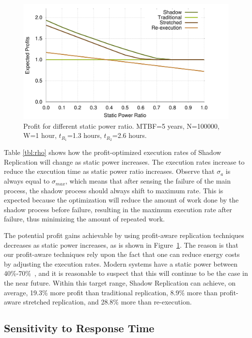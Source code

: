 \begin{figure}[!h]	
	\begin{center}
		\includegraphics[width=\columnwidth]{Figures/rho_profit}
	\end{center}
	\caption{Profit for different static power ratio. MTBF=5 years, N=100000, W=1 hour, $t_{R_1}$=1.3 hours, $t_{R_2}$=2.6 hours.}
	\label{fig:rho}
\end{figure}

Table \ref{tbl:rho} shows how the profit-optimized execution rates
of Shadow Replication will change as static power increases. The execution rates increase to reduce the execution time as static power ratio increases. Observe
that $\sigma_a$ is always equal to $\sigma_{max}$, which means that after
sensing the failure of the main process, the shadow process should always
shift to maximum rate. This is expected because the optimization will
reduce the amount of work done by the shadow process before failure,
resulting in the maximum execution rate after failure, thus
minimizing the amount of repeated work. 

The potential profit gains achievable by using profit-aware
replication techniques decreases as static power increases, as is shown
in Figure~\ref{fig:rho}. The reason is that our profit-aware
techniques rely upon the fact that one can reduce energy costs by
adjusting the execution rates. Modern systems have a static power between 40\%-70\%~\cite{butts2000static}, and
it is reasonable to suspect that this will continue to be the case in the near future. Within
this target range, Shadow Replication can achieve, on
average, 19.3\% more profit than traditional replication, 8.9\% more
than profit-aware stretched replication, and 28.8\% more than re-execution.


\subsection{Sensitivity to Response Time}

